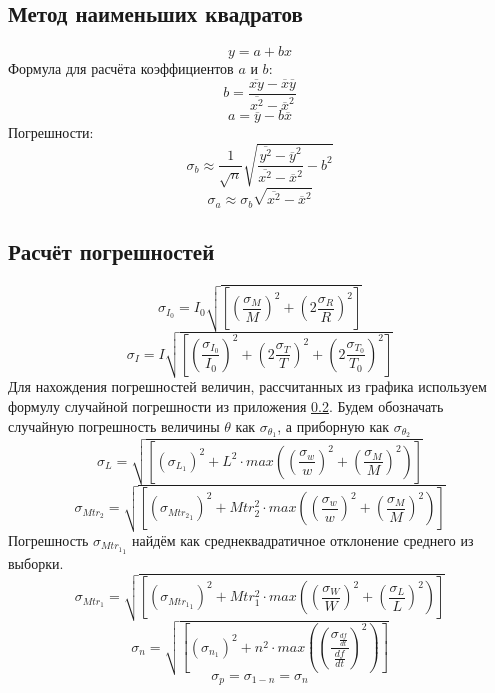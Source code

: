 \documentclass[12pt]{article}
\begin{document}
\subsection{Метод наименьших квадратов} \label{app_4}
$$y = a + bx$$
Формула для расчёта коэффициентов $a$ и $b$:
$$b = \frac{\overline{xy} - \overline{x}\overline{y}}{\overline{x^2} - \overline{x}^2}$$
$$a = \overline{y} - b\overline{x}$$
Погрешности:
$$\sigma_b \approx \frac{1}{\sqrt{n}}\sqrt{\frac{\overline{y^2} - \overline{y}^2}{\overline{x^2} - \overline{x}^2} - b^2}$$
$$\sigma_a \approx \sigma_b \sqrt{\overline{x^2} - \overline{x}^2}$$


\subsection{Расчёт погрешностей} \label{app_5}
$$\sigma_{I_0} = I_0\sqrt{\left[\left(\frac{\sigma_M}{M}\right)^2 + \left(2\frac{\sigma_R}{R}\right)^2\right]}$$
$$\sigma_{I} = I\sqrt{\left[\left(\frac{\sigma_{I_0}}{I_0}\right)^2 + \left(2\frac{\sigma_T}{T}\right)^2 + \left(2\frac{\sigma_{T_0}}{T_0}\right)^2\right]}$$
Для нахождения погрешностей величин, рассчитанных из графика используем формулу случайной погрешности из приложения \ref{app_5}. Будем обозначать
случайную погрешность величины $\theta$ как $\sigma_{\theta_1}$, а приборную как $\sigma_{\theta_2}$ 
$$\sigma_L = \sqrt{\left[\left(\sigma_{L_1}\right)^2 + L^2 \cdot max\left(\left(\frac{\sigma_w}{w}\right)^2 + \left(\frac{\sigma_M}{M}\right)^2\right)\right]}$$
$$\sigma_{Mtr_2} = \sqrt{\left[\left(\sigma_{{Mtr_2}_1}\right)^2 + Mtr_2^2 \cdot max\left(\left(\frac{\sigma_w}{w}\right)^2 + \left(\frac{\sigma_M}{M}\right)^2\right)\right]}$$
Погрешность $\sigma_{{Mtr_1}_1}$ найдём как среднеквадратичное отклонение среднего из выборки.
$$\sigma_{Mtr_1} = \sqrt{\left[\left(\sigma_{{Mtr_1}_1}\right)^2 + Mtr_1^2 \cdot max\left(\left(\frac{\sigma_W}{W}\right)^2 + \left(\frac{\sigma_L}{L}\right)^2\right)\right]}$$
$$\sigma_n = \sqrt{\left[\left(\sigma_{n_1}\right)^2 + n^2 \cdot max\left(\left(\frac{\sigma_{\frac{df}{dt}}}{\frac{df}{dt}}\right)^2\right)\right]}$$
$$\sigma_p = \sigma_{1-n} = \sigma_n$$ 
\end{document}
